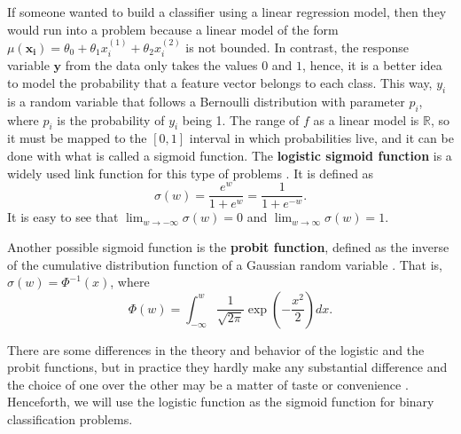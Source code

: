 If someone wanted to build a classifier using a linear regression model, then they would run into a problem because a linear model of the form $\mu(\boldsymbol{x_i}) = \theta_0 + \theta_1 x_i^{(1)} + \theta_2 x_i^{(2)}$ is not bounded. In contrast, the response variable $\boldsymbol{y}$ from the data only takes the values $0$ and $1$, hence, it is a better idea to model the probability that a feature vector belongs to each class. This way, $y_i$ is a random variable that follows a Bernoulli distribution with parameter $p_i$, where $p_i$ is the probability of $y_i$ being 1.
The range of $f$ as a linear model is $\mathbb{R}$, so it must be mapped to the $\left[ 0,1 \right]$ interval in which probabilities live, and it can be done with what is called a sigmoid function. The \textbf{logistic sigmoid function} %
is a widely used link function for this type of problems \cite[p.~114]{christopher2006pattern}. It is defined as
\begin{equation}
  \sigma(w) = \frac{e^w}{1 + e^w} = \frac{1}{1 + e^{-w}}.
\end{equation}
It is easy to see that $\lim_{w \to -\infty} \sigma(w) = 0$ and $\lim_{w \to \infty} \sigma(w) = 1$.


Another possible sigmoid function is the \textbf{probit function}, defined as the inverse of the cumulative distribution function of a Gaussian random variable \cite[p.~296]{friedman2001elements}. That is, $\sigma(w) = \Phi^{-1}\left( x \right)$,
where
\begin{equation}
  \Phi(w) = \int_{-\infty}^w \frac{1}{\sqrt{2 \pi}} \exp{\left( -\frac{x^2}{2} \right)} dx.
\end{equation}

There are some differences in the theory and behavior of the logistic and the probit functions, but in practice they hardly make any substantial difference and the choice of one over the other may be a matter of taste or convenience \cite[p.~118]{gelman2006data}. Henceforth, we will use the logistic function as the sigmoid function for binary classification problems.

